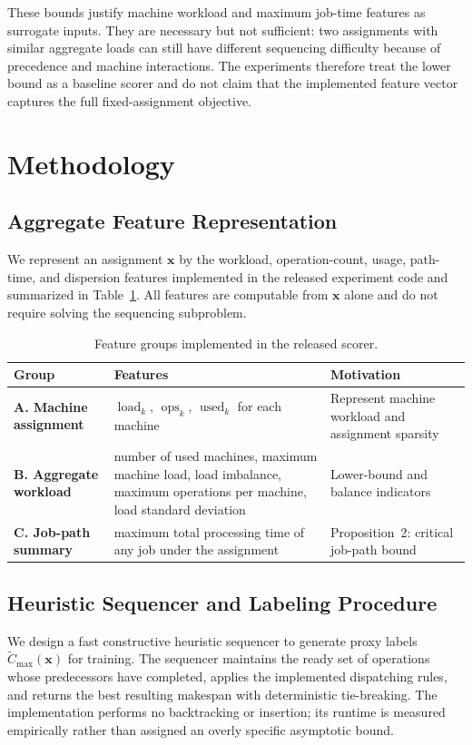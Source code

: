 \documentclass[conference]{IEEEtran}
\begin{document}
These bounds justify machine workload and maximum job-time features as surrogate inputs. They are necessary but not sufficient: two assignments with similar aggregate loads can still have different sequencing difficulty because of precedence and machine interactions. The experiments therefore treat the lower bound as a baseline scorer and do not claim that the implemented feature vector captures the full fixed-assignment objective.

\section{Methodology}

\subsection{Aggregate Feature Representation}
We represent an assignment $\mathbf{x}$ by the workload, operation-count, usage, path-time, and dispersion features implemented in the released experiment code and summarized in Table~\ref{tab:features}. All features are computable from $\mathbf{x}$ alone and do not require solving the sequencing subproblem.

\begin{table}[htbp]\centering\caption{Feature groups implemented in the released scorer.}\label{tab:features}
\footnotesize\setlength{\tabcolsep}{3pt}\begin{tabular}{>{\raggedright\arraybackslash}p{1.5cm}>{\raggedright\arraybackslash}p{3.8cm}>{\raggedright\arraybackslash}p{2.5cm}}\toprule
Group & Features & Motivation \\ \midrule
\textbf{A. Machine assignment} & $\operatorname{load}_k$, $\operatorname{ops}_k$, $\operatorname{used}_k$ for each machine & Represent machine workload and assignment sparsity \\
\textbf{B. Aggregate workload} & number of used machines, maximum machine load, load imbalance, maximum operations per machine, load standard deviation & Lower-bound and balance indicators \\
\textbf{C. Job-path summary} & maximum total processing time of any job under the assignment & Proposition~2: critical job-path bound \\ \bottomrule
\end{tabular}
\end{table}

\subsection{Heuristic Sequencer and Labeling Procedure}
We design a fast constructive heuristic sequencer to generate proxy labels $\tilde{C}_{\max}(\mathbf{x})$ for training. The sequencer maintains the ready set of operations whose predecessors have completed, applies the implemented dispatching rules, and returns the best resulting makespan with deterministic tie-breaking. The implementation performs no backtracking or insertion; its runtime is measured empirically rather than assigned an overly specific asymptotic bound.
\end{document}
